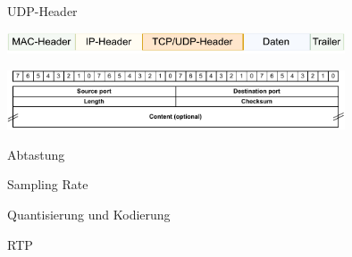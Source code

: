 \begin{defi}{UDP-Header}
    \begin{center}
        \includegraphics[width=0.75\textwidth]{includes/figures/defi_tcp_header_kapselung.pdf}

        \includegraphics[width=0.75\textwidth]{includes/figures/defi_udp_header.pdf}
    \end{center}
\end{defi}

\begin{bonus}{Abtastung}

\end{bonus}

\begin{defi}{Sampling Rate}

\end{defi}

\begin{bonus}{Quantisierung und Kodierung}

\end{bonus}

\begin{defi}{RTP}

\end{defi}
